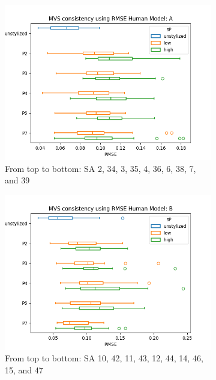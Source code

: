 \begin{figure}[ht]
	\centering
	\begin{subfigure}{0.49\textwidth}
		\includegraphics[width=\linewidth]{Figures/results/good/rmse_dora.png}
		\caption{From top to bottom: SA 2, 34, 3, 35, 4, 36, 6, 38, 7, and 39}
		\label{fig:rmse_dora}
	\end{subfigure}
	\begin{subfigure}{0.49\textwidth}
		\includegraphics[width=\linewidth]{Figures/results/good/rmse_ephra.png}
		\caption{From top to bottom: SA 10, 42, 11, 43, 12, 44, 14, 46, 15, and 47}
		\label{fig:rmse_ephra}
	\end{subfigure}
	\begin{subfigure}{0.49\textwidth}

\end{subfigure}
\end{figure}
